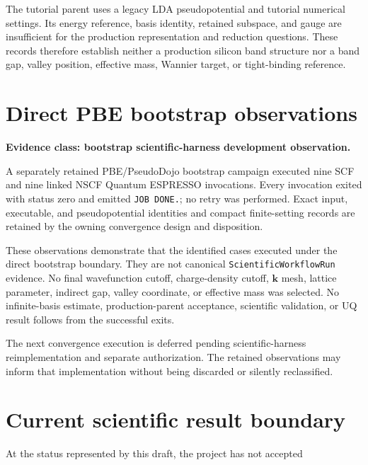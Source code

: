 The tutorial parent uses a legacy LDA pseudopotential and tutorial numerical
settings. Its energy reference, basis identity, retained subspace, and gauge are
insufficient for the production representation and reduction questions. These
records therefore establish neither a production silicon band structure nor a
band gap, valley position, effective mass, Wannier target, or tight-binding
reference.

\section{Direct PBE bootstrap observations}

\textbf{Evidence class: bootstrap scientific-harness development observation.}

A separately retained PBE/PseudoDojo bootstrap campaign executed nine SCF and
nine linked NSCF Quantum ESPRESSO invocations. Every invocation exited with
status zero and emitted \texttt{JOB DONE.}; no retry was performed. Exact input,
executable, and pseudopotential identities and compact finite-setting records
are retained by the owning convergence design and disposition.

These observations demonstrate that the identified cases executed under the
direct bootstrap boundary. They are not canonical
\texttt{ScientificWorkflowRun} evidence. No final wavefunction cutoff,
charge-density cutoff, $\mathbf k$ mesh, lattice parameter, indirect gap,
valley coordinate, or effective mass was selected. No infinite-basis estimate,
production-parent acceptance, scientific validation, or UQ result follows from
the successful exits.

The next convergence execution is deferred pending scientific-harness
reimplementation and separate authorization. The retained observations may
inform that implementation without being discarded or silently reclassified.

\section{Current scientific result boundary}

At the status represented by this draft, the project has not accepted

